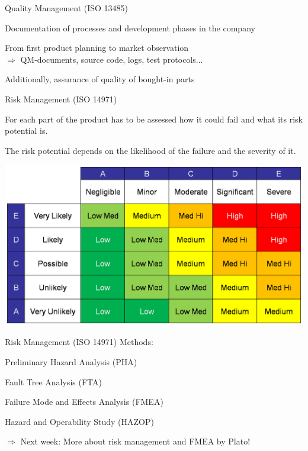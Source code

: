\begin{frame}{Quality Management (ISO 13485)}
	\begin{beameritemize}
		\item Documentation of processes and development phases in the company
		\item From first product planning to market observation\\
		 $\Rightarrow$ QM-documents, source code, logs, test protocols...
		\item Additionally, assurance of quality of bought-in parts
	\end{beameritemize}	
	
	
\end{frame}


\begin{frame}{Risk Management (ISO 14971)}
	\begin{beameritemize}
		\item For each part of the product has to be assessed how it could fail and what its risk potential is.
		\item The risk potential depends on the likelihood of the failure and the severity of it.		 
	\end{beameritemize}	
	\xxx
	\centering
	\includegraphics[width=0.7\linewidth]{content/images/certification/risk_matrix}
\end{frame}


\begin{frame}{Risk Management (ISO 14971)}
	Methods:
	\begin{beameritemize}
		\item Preliminary Hazard Analysis (PHA)
		\item Fault Tree Analysis (FTA)
		\item Failure Mode and Effects Analysis (FMEA) 
		\item Hazard and Operability Study (HAZOP)
	\end{beameritemize}	
	\xxx
	$\Rightarrow$ Next week: More about risk management and FMEA by Plato!
	
	
\end{frame}


